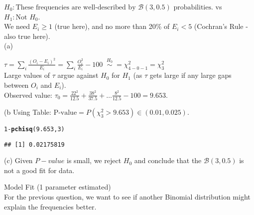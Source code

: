 \documentclass[bigtut]{tutorial}\usepackage[]{graphicx}\usepackage[]{color}
\makeatletter
\newcommand{\hlnum}[1]{\textcolor[rgb]{0.686,0.059,0.569}{#1}}%
\newcommand{\hlopt}[1]{\textcolor[rgb]{0,0,0}{#1}}%
\newcommand{\hlstd}[1]{\textcolor[rgb]{0.345,0.345,0.345}{#1}}%
\newcommand{\hlkwd}[1]{\textcolor[rgb]{0.737,0.353,0.396}{\textbf{#1}}}%
\newenvironment{kframe}{%
 \def\at@end@of@kframe{}%
 \ifinner\ifhmode%
  \def\at@end@of@kframe{\end{minipage}}%
  \begin{minipage}{\columnwidth}%
 \fi\fi%
 \def\FrameCommand##1{\hskip\@totalleftmargin \hskip-\fboxsep
 \colorbox{shadecolor}{##1}\hskip-\fboxsep
     \hskip-\linewidth \hskip-\@totalleftmargin \hskip\columnwidth}%
 \MakeFramed {\advance\hsize-\width
   \@totalleftmargin\z@ \linewidth\hsize
   \@setminipage}}%
 {\par\unskip\endMakeFramed%
 \at@end@of@kframe}
\newenvironment{knitrout}{}{} %
\makeatother
\begin{document}
\begin{tutorial}
\begin{questions}
\begin{solution}
\vspace{.5cm}
$H_0: \text{These frequencies are
well-described by } \mathcal B(3,0.5) \text{ probabilities.}$ \;\; vs $H_1: \text{Not } H_{0}$. \\

 We need $E_{i} \geq 1$ (true here), and no more than 20\% of $E_{i} < 5$ (Cochran's Rule - also true here).\\

\vspace{.5cm}
(a)

 $\tau = \sum_{i}  \frac{  (O_i - E_i)^2  } {  E_i }  =   \sum_{i}  \frac{  O_i^2  } {  E_i }  -100   \; \; 
\overset{H_0}{\sim} \; = \chi^2_{4-0-1} = \chi^2_{3}$ \\

Large values of $\tau$ argue against $H_{0}$ for $H_{1}$ (as $\tau$ gets large if any large gaps between $O_{i}$ and $E_{i}$). \\

Observed value: $\tau_{0} = 
\frac{22^2}{12.5} + \frac{38^2}{37.5} + \ldots \frac{8^2}{12.5} - 100 = 9.653$.

(b
Using Table: 
$\text{P-value} =  P(\chi^2_{3} > 9.653) \in(0.01,0.025)$. 

\begin{knitrout}
\color{fgcolor}\begin{kframe}
\begin{alltt}
\hlnum{1}\hlopt{-}\hlkwd{pchisq}\hlstd{(}\hlnum{9.653}\hlstd{,}\hlnum{3}\hlstd{)}
\end{alltt}
\begin{verbatim}
## [1] 0.02175819
\end{verbatim}
\end{kframe}
\end{knitrout}

(c)
Given $P-value$ is small, we reject $H_{0}$ and conclude that the $\mathcal B(3,0.5)$ is not a good fit for data.
\end{solution}


\question Model Fit (1 parameter estimated) \\

For the previous question, we want to see if another Binomial distribution might explain the frequencies better. \\

\end{questions}
\end{tutorial}
\end{document}
